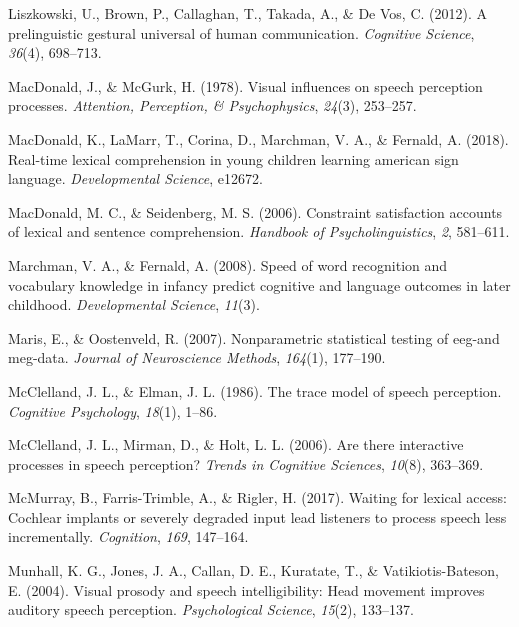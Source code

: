 \documentclass[english,floatsintext,man]{apa6}
\begin{document}
\leavevmode\hypertarget{ref-liszkowski2012prelinguistic}{}%
Liszkowski, U., Brown, P., Callaghan, T., Takada, A., \& De Vos, C.
(2012). A prelinguistic gestural universal of human communication.
\emph{Cognitive Science}, \emph{36}(4), 698--713.

\leavevmode\hypertarget{ref-macdonald1978visual}{}%
MacDonald, J., \& McGurk, H. (1978). Visual influences on speech
perception processes. \emph{Attention, Perception, \& Psychophysics},
\emph{24}(3), 253--257.

\leavevmode\hypertarget{ref-macdonald2018real}{}%
MacDonald, K., LaMarr, T., Corina, D., Marchman, V. A., \& Fernald, A.
(2018). Real-time lexical comprehension in young children learning
american sign language. \emph{Developmental Science}, e12672.

\leavevmode\hypertarget{ref-macdonald2006constraint}{}%
MacDonald, M. C., \& Seidenberg, M. S. (2006). Constraint satisfaction
accounts of lexical and sentence comprehension. \emph{Handbook of
Psycholinguistics}, \emph{2}, 581--611.

\leavevmode\hypertarget{ref-marchman2008speed}{}%
Marchman, V. A., \& Fernald, A. (2008). Speed of word recognition and
vocabulary knowledge in infancy predict cognitive and language outcomes
in later childhood. \emph{Developmental Science}, \emph{11}(3).

\leavevmode\hypertarget{ref-maris2007nonparametric}{}%
Maris, E., \& Oostenveld, R. (2007). Nonparametric statistical testing
of eeg-and meg-data. \emph{Journal of Neuroscience Methods},
\emph{164}(1), 177--190.

\leavevmode\hypertarget{ref-mcclelland1986trace}{}%
McClelland, J. L., \& Elman, J. L. (1986). The trace model of speech
perception. \emph{Cognitive Psychology}, \emph{18}(1), 1--86.

\leavevmode\hypertarget{ref-mcclelland2006there}{}%
McClelland, J. L., Mirman, D., \& Holt, L. L. (2006). Are there
interactive processes in speech perception? \emph{Trends in Cognitive
Sciences}, \emph{10}(8), 363--369.

\leavevmode\hypertarget{ref-mcmurray2017waiting}{}%
McMurray, B., Farris-Trimble, A., \& Rigler, H. (2017). Waiting for
lexical access: Cochlear implants or severely degraded input lead
listeners to process speech less incrementally. \emph{Cognition},
\emph{169}, 147--164.

\leavevmode\hypertarget{ref-munhall2004visual}{}%
Munhall, K. G., Jones, J. A., Callan, D. E., Kuratate, T., \&
Vatikiotis-Bateson, E. (2004). Visual prosody and speech
intelligibility: Head movement improves auditory speech perception.
\emph{Psychological Science}, \emph{15}(2), 133--137.
\end{document}

